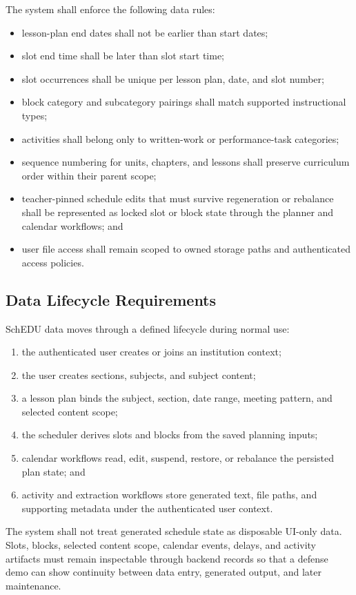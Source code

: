\documentclass[12pt]{article}
\begin{document}
The system shall enforce the following data rules:
\begin{itemize}
\item lesson-plan end dates shall not be earlier than start dates;
\item slot end time shall be later than slot start time;
\item slot occurrences shall be unique per lesson plan, date, and slot number;
\item block category and subcategory pairings shall match supported instructional
types;
\item activities shall belong only to written-work or performance-task
categories;
\item sequence numbering for units, chapters, and lessons shall preserve
curriculum order within their parent scope;
\item teacher-pinned schedule edits that must survive regeneration or rebalance
shall be represented as locked slot or block state through the planner and
calendar workflows; and
\item user file access shall remain scoped to owned storage paths and
authenticated access policies.
\end{itemize}

\subsection{Data Lifecycle Requirements}

SchEDU data moves through a defined lifecycle during normal use:
\begin{enumerate}
\item the authenticated user creates or joins an institution context;
\item the user creates sections, subjects, and subject content;
\item a lesson plan binds the subject, section, date range, meeting pattern, and selected content scope;
\item the scheduler derives slots and blocks from the saved planning inputs;
\item calendar workflows read, edit, suspend, restore, or rebalance the persisted plan state; and
\item activity and extraction workflows store generated text, file paths, and supporting metadata under the authenticated user context.
\end{enumerate}

The system shall not treat generated schedule state as disposable UI-only data.
Slots, blocks, selected content scope, calendar events, delays, and activity
artifacts must remain inspectable through backend records so that a defense demo
can show continuity between data entry, generated output, and later maintenance.
\end{document}

